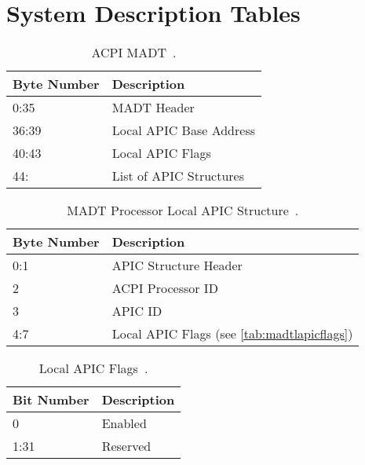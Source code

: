 \clearpage

\section{System Description Tables}
\label{sec:sdts}

\begin{table}[H]
  \centering
  \begin{tabularx}{1.0\textwidth}{| X | X |}
    \hline
    \textbf{Byte Number} & \textbf{Description}    \\ \hline\hline
    0:35                 & MADT Header             \\ \hline
    36:39                & Local APIC Base Address \\ \hline
    40:43                & Local APIC Flags        \\ \hline
    44:                  & List of APIC Structures \\ \hline
  \end{tabularx}
  \caption{ACPI MADT~\autocite[sec.~5.2.8]{acpi1}.}
  \label{tab:madt}
\end{table}

\begin{table}[H]
  \centering
  \begin{tabularx}{1.0\textwidth}{| X | X |}
    \hline
    \textbf{Byte Number} & \textbf{Description}                                \\ \hline\hline
    0:1                  & APIC Structure Header                               \\ \hline
    2                    & ACPI Processor ID                                   \\ \hline
    3                    & APIC ID                                             \\ \hline
    4:7                  & Local APIC Flags (see \autoref{tab:madtlapicflags}) \\ \hline
  \end{tabularx}
  \caption{MADT Processor Local APIC Structure~\autocite[sec.~5.2.8.1]{acpi1}.}
  \label{tab:madtlapic}
\end{table}

\begin{table}[H]
  \centering
  \begin{tabularx}{1.0\textwidth}{| X | X |}
    \hline
    \textbf{Bit Number} & \textbf{Description} \\ \hline\hline
    0                   & Enabled              \\ \hline
    1:31                & Reserved             \\ \hline
  \end{tabularx}
  \caption{Local APIC Flags~\autocite[sec.~5.2.8.1]{acpi1}.}
  \label{tab:madtlapicflags}
\end{table}

